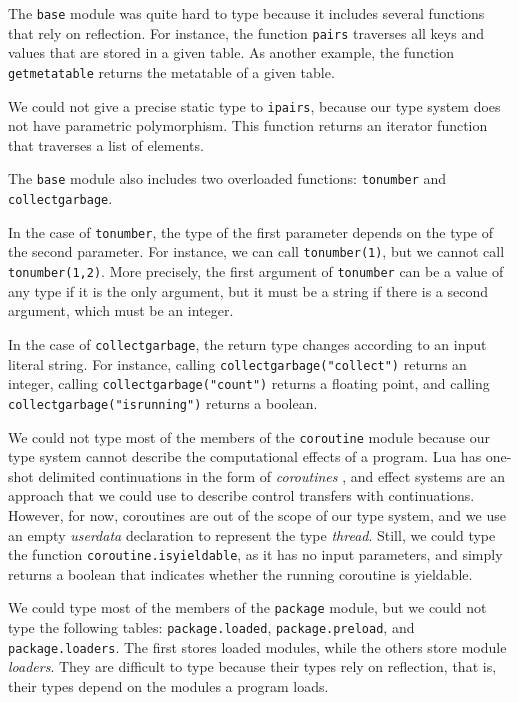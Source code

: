 The \texttt{base} module was quite hard to type because it
includes several functions that rely on reflection.
For instance, the function \texttt{pairs} traverses all
keys and values that are stored in a given table.
As another example, the function \texttt{getmetatable}
returns the metatable of a given table.

We could not give a precise static type to \texttt{ipairs},
because our type system does not have parametric polymorphism.
This function returns an iterator function that traverses a
list of elements.

The \texttt{base} module also includes two overloaded functions:
\texttt{tonumber} and \texttt{collectgarbage}.

In the case of \texttt{tonumber}, the type of the first parameter
depends on the type of the second parameter.
For instance, we can call \texttt{tonumber(1)}, but we cannot
call \texttt{tonumber(1,2)}.
More precisely, the first argument of \texttt{tonumber} can be
a value of any type if it is the only argument, but it must
be a string if there is a second argument,
which must be an integer.

In the case of \texttt{collectgarbage}, the return type changes
according to an input literal string.
For instance, calling \texttt{collectgarbage("collect")} returns an integer,
calling \texttt{collectgarbage("count")} returns a floating point,
and calling \texttt{collectgarbage("isrunning")} returns a boolean.

We could not type most of the members of the \texttt{coroutine} module
because our type system cannot describe the computational effects of a program.
Lua has one-shot delimited continuations \citep{james2011yield}
in the form of \emph{coroutines} \citep{moura2009rc}, and
effect systems \citep{nielson1999type} are an approach that we
could use to describe control transfers with continuations.
However, for now, coroutines are out of the scope of our type
system, and we use an empty \emph{userdata} declaration
to represent the type \emph{thread}.
Still, we could type the function \texttt{coroutine.isyieldable},
as it has no input parameters, and simply returns a boolean that
indicates whether the running coroutine is yieldable.

We could type most of the members of the \texttt{package} module,
but we could not type the following tables: \texttt{package.loaded},
\texttt{package.preload}, and \texttt{package.loaders}.
The first stores loaded modules, while the others store module \emph{loaders}.
They are difficult to type because their types rely on reflection,
that is, their types depend on the modules a program loads.

